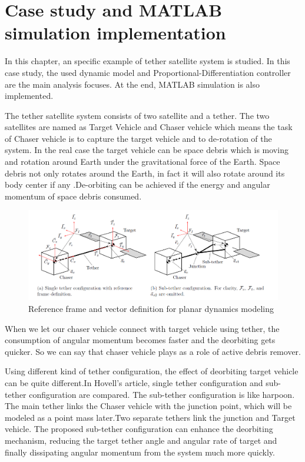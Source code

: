 \chapter{Case study and MATLAB simulation implementation}\label{section-case}
In this chapter, an specific example\cite{hovell2017experimental} of tether satellite system is studied. In this case study, the used dynamic model and Proportional-Differentiation controller are the main analysis focuses. At the end, MATLAB simulation is also implemented.

The tether satellite system consists of two satellite and a tether. The two satellites are named as Target Vehicle and Chaser vehicle which means the task of Chaser vehicle is to capture the target vehicle and to de-rotation of the system. In the real case the target vehicle can be space debris which is moving and rotation around Earth under the gravitational force of the Earth. Space debris not only rotates around the Earth, in fact it will also rotate around its body center if any .De-orbiting can be achieved if the energy and angular momentum of space debris consumed.
\begin{figure}[ht]

\includegraphics[width=\textwidth]{fig/simulation/ReferenceFrame}
\caption{Reference frame and vector definition for planar dynamics modeling}

\end{figure}
When we let our chaser vehicle connect with target vehicle using tether, the consumption of angular momentum becomes faster and the deorbiting gets quicker.  
So we can say that chaser vehicle plays as a role of active debris remover.

Using different kind of tether configuration, the effect of deorbiting target vehicle can be quite different.In Hovell's article, single tether configuration and sub-tether configuration are compared. The sub-tether configuration is like harpoon. The main tether links the Chaser vehicle with the junction point, which will be modeled as a point mass later.Two separate tethers link the junction and Target vehicle. The proposed sub-tether configuration can enhance the deorbiting mechanism, reducing the target tether angle and angular rate of target and finally dissipating angular momentum from the system much more quickly.  
